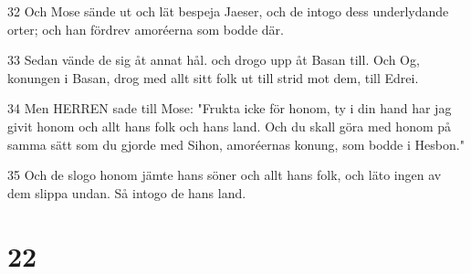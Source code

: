 \par 32 Och Mose sände ut och lät bespeja Jaeser, och de intogo dess underlydande orter; och han fördrev amoréerna som bodde där.
\par 33 Sedan vände de sig åt annat hål. och drogo upp åt Basan till. Och Og, konungen i Basan, drog med allt sitt folk ut till strid mot dem, till Edrei.
\par 34 Men HERREN sade till Mose: "Frukta icke för honom, ty i din hand har jag givit honom och allt hans folk och hans land. Och du skall göra med honom på samma sätt som du gjorde med Sihon, amoréernas konung, som bodde i Hesbon."
\par 35 Och de slogo honom jämte hans söner och allt hans folk, och läto ingen av dem slippa undan. Så intogo de hans land.

\chapter{22}

